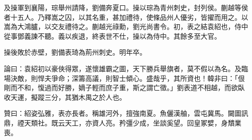 \begin{pinyinscope}
及操軍到襄陽，琮舉州請降，劉備奔夏口。操以琮為青州刺史，封列侯。蒯越等侯者十五人。乃釋嵩之囚，以其名重，甚加禮待，使條品州人優劣，皆擢而用之。以嵩為大鴻臚，以交友禮待之。蒯越光祿勳，劉光尚書令。初，表之結袁紹也，侍中從事鄧義諫不聽。義以疾退，終表世不仕，操以為侍中。其餘多至大官。

操後敗於赤壁，劉備表琦為荊州刺史。明年卒。

論曰：袁紹初以豪俠得眾，遂懷雄霸之圖，天下勝兵舉旗者，莫不假以為名。及臨場決敵，則悍夫爭命；深籌高議，則智士傾心。盛哉乎，其所資也！韓非曰：「佷剛而不和，愎過而好勝，嫡子輕而庶子重，斯之謂亡徵。」劉表道不相越，而欲臥收天運，擬蹤三分，其猶木禺之於人也。

贊曰：紹姿弘雅，表亦長者。稱雄河外，擅強南夏。魚儷漢舳，雲屯冀馬。闚圖訊鼎，禋天類社。既云天工，亦資人亮。矜彊少成，坐談奚望。回皇冢嬖，身穨業喪。


\end{pinyinscope}